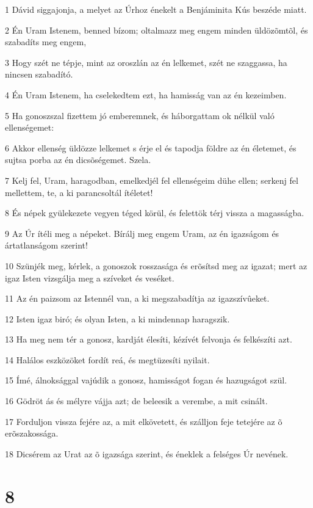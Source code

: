 \par 1 Dávid siggajonja, a melyet az Úrhoz énekelt a Benjáminita Kús beszéde miatt.
\par 2 Én Uram Istenem, benned bízom; oltalmazz meg engem minden üldözõmtõl, és szabadíts meg engem,
\par 3 Hogy szét ne tépje, mint az oroszlán az én lelkemet, szét ne szaggassa, ha nincsen szabadító.
\par 4 Én Uram Istenem, ha cselekedtem ezt, ha hamisság van az én kezeimben.
\par 5 Ha gonoszszal fizettem jó emberemnek, és háborgattam ok nélkül való ellenségemet:
\par 6 Akkor ellenség üldözze lelkemet s érje el és tapodja földre az én életemet, és sujtsa porba az én dicsõségemet. Szela.
\par 7 Kelj fel, Uram, haragodban, emelkedjél fel ellenségeim dühe ellen; serkenj fel mellettem, te, a ki parancsoltál ítéletet!
\par 8 És népek gyülekezete vegyen téged körül, és felettök térj vissza a magasságba.
\par 9 Az Úr ítéli meg a népeket. Bírálj meg engem Uram, az én igazságom és ártatlanságom szerint!
\par 10 Szünjék meg, kérlek, a gonoszok rosszasága és erõsítsd meg az igazat; mert az igaz Isten vizsgálja meg a szíveket és veséket.
\par 11 Az én paizsom az Istennél van, a ki megszabadítja az igazszívûeket.
\par 12 Isten igaz biró; és olyan Isten, a ki mindennap haragszik.
\par 13 Ha meg nem tér a gonosz, kardját élesíti, kézívét felvonja és felkészíti azt.
\par 14 Halálos eszközöket fordít reá, és megtüzesíti nyilait.
\par 15 Ímé, álnoksággal vajúdik a gonosz, hamisságot fogan és hazugságot szül.
\par 16 Gödröt ás és mélyre vájja azt; de beleesik a verembe, a mit csinált.
\par 17 Forduljon vissza fejére az, a mit elkövetett, és szálljon feje tetejére az õ erõszakossága.
\par 18 Dicsérem az Urat az õ igazsága szerint, és éneklek a felséges Úr nevének.

\chapter{8}

